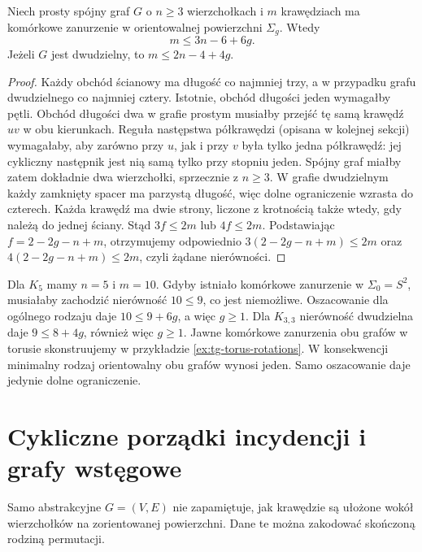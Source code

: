 \begin{stwierdzenie}
Niech prosty spójny graf $G$ o $n\ge3$ wierzchołkach
i $m$ krawędziach ma komórkowe zanurzenie w orientowalnej
powierzchni $\Sigma_g$. Wtedy
\[
 m\le3n-6+6g.
\]
Jeżeli $G$ jest dwudzielny, to
$m\le2n-4+4g$.
\end{stwierdzenie}

\begin{proof}
Każdy obchód ścianowy ma długość co najmniej trzy,
a w przypadku grafu dwudzielnego co najmniej cztery.
Istotnie, obchód długości jeden wymagałby pętli.
Obchód długości dwa w grafie prostym musiałby przejść
tę samą krawędź $uv$ w obu kierunkach.
Reguła następstwa półkrawędzi (opisana w kolejnej
sekcji) wymagałaby, aby zarówno przy $u$, jak i przy
$v$ była tylko jedna półkrawędź: jej cykliczny
następnik jest nią samą tylko przy stopniu jeden.
Spójny graf miałby zatem dokładnie dwa wierzchołki,
sprzecznie z $n\ge3$. W grafie dwudzielnym każdy
zamknięty spacer ma parzystą długość, więc dolne
ograniczenie wzrasta do czterech.
Każda krawędź ma dwie strony, liczone z krotnością
także wtedy, gdy należą do jednej ściany.
Stąd $3f\le2m$ lub $4f\le2m$. Podstawiając
$f=2-2g-n+m$, otrzymujemy odpowiednio
$3(2-2g-n+m)\le2m$ oraz $4(2-2g-n+m)\le2m$,
czyli żądane nierówności.
\end{proof}

\begin{przyklad}
Dla $K_5$ mamy $n=5$ i $m=10$. Gdyby istniało
komórkowe zanurzenie w $\Sigma_0=S^2$, musiałaby zachodzić
nierówność $10\le9$, co jest niemożliwe.
Oszacowanie dla ogólnego rodzaju daje
$10\le9+6g$, a więc $g\ge1$.
Dla $K_{3,3}$ nierówność dwudzielna daje
$9\le 8+4g$, również więc $g\ge1$.
Jawne komórkowe zanurzenia obu grafów w torusie
skonstruujemy w przykładzie \ref{ex:tg-torus-rotations}.
W konsekwencji minimalny rodzaj orientowalny obu
grafów wynosi jeden. Samo oszacowanie daje jedynie
dolne ograniczenie.
\end{przyklad}

\section{Cykliczne porządki incydencji i grafy wstęgowe}
\label{sec:tg-rotation}

Samo abstrakcyjne $G=(V,E)$ nie zapamiętuje, jak krawędzie
są ułożone wokół wierzchołków na zorientowanej powierzchni.
Dane te można zakodować skończoną rodziną permutacji.

